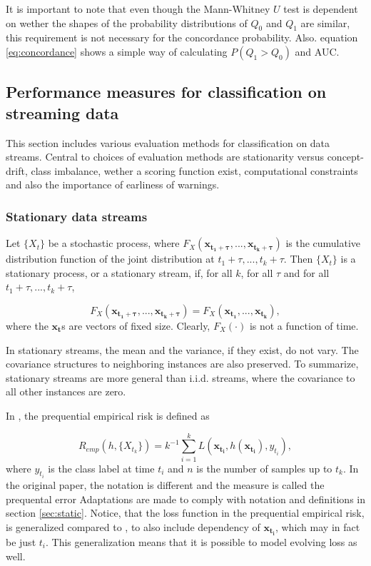 It is important to note that even though the Mann-Whitney $U$ test is dependent on wether the shapes of the probability distributions of $Q_0$ and $Q_1$ are similar, this requirement is not necessary for the concordance probability.  Also. equation \eqref{eq:concordance} shows a simple way of calculating $P(Q_1 > Q_0)$ and AUC.

\subsection{Performance measures for classification on streaming data}
\label{sec:stream}

This section includes various evaluation methods for classification on data streams.  Central to choices of evaluation methods are stationarity versus concept-drift, class imbalance, wether a scoring function exist, computational constraints and also the importance of earliness of warnings.

\subsubsection{Stationary data streams}

Let $\{X_{t}\}$ be a stochastic process, where $F_X(\bm{x_{t_1 + \tau}},...,\bm{x_{t_k + \tau}} )$ is the cumulative distribution function of the joint distribution at $t_1 + \tau,...,t_k + \tau$.  Then $\{X_t\}$ is a stationary process, or a stationary stream, if, for all $k$, for all $\tau$ and for all $t_1 + \tau,...,t_k + \tau$, 

\begin{equation}
\label{eq:stationarity}
F_X(\bm{x_{t_1 + \tau}},...,\bm{x_{t_k + \tau}} ) = F_X(\bm{x_{t_1}},...,\bm{x_{t_k}} ),
\end{equation}
where the $\bm{x_t}$s are vectors of fixed size.  Clearly, $F_X(\cdot)$ is not a function of time.  

In stationary streams, the mean and the variance, if they exist, do not vary.  The covariance structures to neighboring instances are also preserved.  To summarize, stationary streams are more general than i.i.d. streams, where the covariance to all other instances are zero.  

In \cite{Gam13}, the prequential empirical risk is defined as 

\begin{equation}
\label{eq:prequentialRisk}
R_{emp}(h, \{X_{t_k}\}) = k^{-1} \sum_{i=1}^k L(\bm{x_{t_i}} , h(\bm{x_{t_i}} ), y_{t_i}),
\end{equation}
where $y_{t_i}$ is the class label at time $t_i$ and $n$ is the number of samples up to $t_k$.  In the original paper, the notation is different and the measure is called the prequental error  Adaptations are made to comply with notation and definitions in section \ref{sec:static}.  Notice, that the loss function in the prequential empirical risk, is generalized compared to \cite{Gam13}, to also include dependency of $\bm{x_{t_i}}$, which may in fact be just $t_i$.  This generalization means that it is possible to model evolving loss as well.

